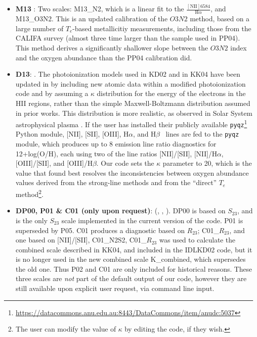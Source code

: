 \documentclass{emulateapj}
\newcommand{\ha}{H$\alpha$}
\newcommand{\hb}{H$\beta$}
\begin{document}
\begin{itemize}
\item {\bf M13} \citep{marino13}: Two scales: M13\_N2, which is a linear fit to the $\frac{\mathrm{[NII]6584}}{\mathrm{H}\alpha}$, and  M13\_O3N2. This is an updated calibration of the $O3N2$ method, based on a large number of $T_e$-based metallicitiy measurements, including those from the CALIFA survey (almost three time larger than the sample used in PP04). This method derives a significantly shallower slope between the $O3N2$ index and the oxygen abundance than the PP04 calibration did.
\item {\bf D13}: \citep{dopita13}. The photoionization models used in KD02 and in KK04 have been updated in \citet{dopita13} by including new atomic data within a modified photoionization code and by assuming a $\kappa$ distribution for the energy of the electrons in the HII regions, rather than the simple  Maxwell-Boltzmann distribution assumed in prior works. This distribution is more realistic, as observed in Solar System astrophysical plasma \citep{nicholls12}. If the user has installed their publicly available \verb=pyqz=\footnote{\url{https://datacommons.anu.edu.au:8443/DataCommons/item/anudc:5037}} Python module, [NII], [SII], [OIII], \ha, and \hb~ lines are fed to the \verb=pyqz= module, which produces up to 8 emission line ratio diagnostics for 12+log(O/H), each using two of the line ratios [NII]/[SII], [NII]/\ha, [OIII]/[SII], and [OIII]/\hb. Our code sets the $\kappa$ parameter to 20, which is the value that \citet{dopita13} found best resolves the inconsistencies between oxygen abundance values derived from the strong-line methods and from the ``direct'' $T_e$ method\footnote{The user can modify the value of $\kappa$ by editing the code, if they wish.}.
\item{\bf DP00, P01 \& C01 (only upon request)}: (\citealt{diaz00}, \citealt{pilyugin01}, \citealt{charlot01}). DP00 is based on $S_{23}$, and is the only $S_{23}$ scale implemented in the current version of the code. P01 is superseded by P05. C01 produces a diagnostic based on $R_{23}$; C01\_$R_{23}$, and one based on [NII]/[SII], C01\_N2S2, C01\_$R_{23}$ was used to calculate the combined scale described in KK04, and included in the IDLKD02 code, but it is no longer used in the new combined scale K\_combined, which supersedes the old one. Thus P02 and C01 are only included for historical reasons. These three scales are \emph{not} part of the default output of our code, however they are still available upon explicit user request, via command line input.

\end{itemize}
\end{document}
